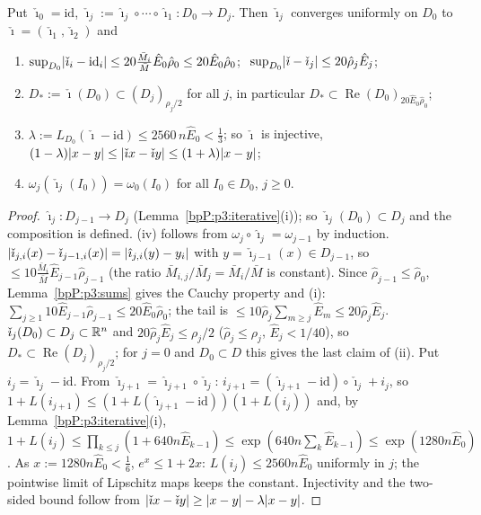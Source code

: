 \begin{lemma}\label{bpP:p3:limit-actions}
Put $\check\imath_0=\mathrm{id}$, $\check\imath_j:=\hat\imath_j\circ\cdots\circ\hat\imath_1:D_0\to D_j$. Then $\check\imath_j$ converges uniformly on $D_0$ to $\check\imath=(\check\imath_1,\check\imath_2)$ and
\begin{enumerate}[label=(\roman*)]
\item $\sup_{D_0}\lvert \check\imath_i-\mathrm{id}_i\rvert\le20\frac{\bar M_i}{\bar M}\hat E_0\hat\rho_0\le20\hat E_0\hat\rho_0$; $\ \sup_{D_0}\abs{\check\imath-\check\imath_j}\le20\hat\rho_j\hat E_j$;
\item $D_*:=\check\imath(D_0)\subset(D_j)_{\rho_j/2}$ for all $j$, in particular $D_*\subset\operatorname{Re}(D_0)_{20\hat E_0\hat\rho_0}$;
\item $\lambda:=L_{D_0}(\check\imath-\mathrm{id})\le2560\,n\hat E_0<\frac13$; so $\check\imath$ is injective, $(1-\lambda)\lvert x-y\rvert\le\lvert \check\imath x-\check\imath y\rvert\le(1+\lambda)\lvert x-y\rvert$;
\item $\omega_j(\check\imath_j(I_0))=\omega_0(I_0)$ for all $I_0\in D_0$, $j\ge0$.
\end{enumerate}
\end{lemma}
\begin{proof}
\label{stepP:p3:la-wp}
$\hat\imath_{j}:D_{j-1}\to D_{j}$ (Lemma~\ref{bpP:p3:iterative}(i)); so $\check\imath_j(D_0)\subset D_j$ and the composition is defined. (iv) follows from $\omega_j\circ\hat\imath_j=\omega_{j-1}$ by induction.
\label{stepP:p3:la-tele}
$\lvert \check\imath_{j,i}(x)-\check\imath_{j-1,i}(x)\rvert=\lvert \hat\imath_{j,i}(y)-y_i\rvert$ with $y=\check\imath_{j-1}(x)\in D_{j-1}$, so $\le10\frac{\bar M_i}{\bar M}\hat E_{j-1}\hat\rho_{j-1}$ (the ratio $\bar M_{i,j}/\bar M_j=\bar M_i/\bar M$ is constant). Since $\hat\rho_{j-1}\le\hat\rho_0$, Lemma~\ref{bpP:p3:sums} gives the Cauchy property and (i): $\sum_{j\ge1}10\hat E_{j-1}\hat\rho_{j-1}\le20\hat E_0\hat\rho_0$; the tail is $\le10\hat\rho_j\sum_{m\ge j}\hat E_m\le20\hat\rho_j\hat E_j$.
\label{stepP:p3:la-loc}
$\check\imath_j(D_0)\subset D_j\subset\mathbb{R}^n$ and $20\hat\rho_j\hat E_j\le\rho_j/2$ ($\hat\rho_j\le\rho_j$, $\hat E_j<1/40$), so $D_*\subset\operatorname{Re}(D_j)_{\rho_j/2}$; for $j=0$ and $D_0\subset D$ this gives the last claim of (ii).
\label{stepP:p3:la-lip}
Put $i_j=\check\imath_j-\mathrm{id}$. From $\check\imath_{j+1}=\hat\imath_{j+1}\circ\check\imath_j$: $i_{j+1}=(\hat\imath_{j+1}-\mathrm{id})\circ\check\imath_j+i_j$, so $1+L(i_{j+1})\le(1+L(\hat\imath_{j+1}-\mathrm{id}))(1+L(i_j))$ and, by Lemma~\ref{bpP:p3:iterative}(i), $1+L(i_j)\le\prod_{k\le j}(1+640n\hat E_{k-1})\le\exp(640n\sum_k\hat E_{k-1})\le\exp(1280n\hat E_0)$. As $x:=1280n\hat E_0<\frac16$, $e^x\le1+2x$: $L(i_j)\le2560n\hat E_0$ uniformly in $j$; the pointwise limit of Lipschitz maps keeps the constant. Injectivity and the two-sided bound follow from $\lvert \check\imath x-\check\imath y\rvert\ge\lvert x-y\rvert-\lambda\lvert x-y\rvert$.
\end{proof}

